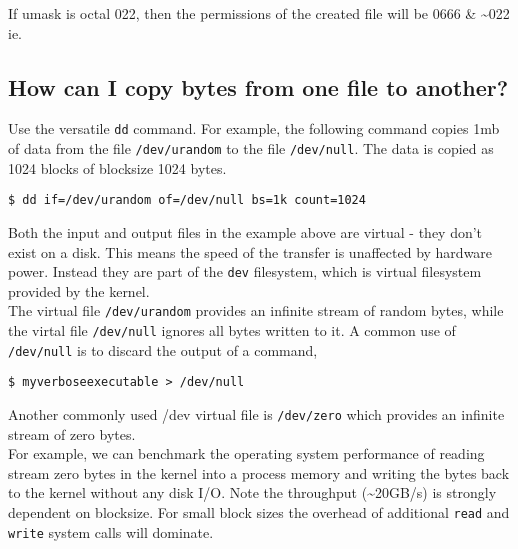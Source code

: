 If umask is octal 022, then the permissions of the created file will be
0666 \& \textasciitilde{}022\\ie.

\begin{Shaded}
\begin{Highlighting}[]
\end{Highlighting}
\end{Shaded}

\subsection{How can I copy bytes from one file to
another?}\label{how-can-i-copy-bytes-from-one-file-to-another}

Use the versatile \texttt{dd} command. For example, the following
command copies 1mb of data from the file \texttt{/dev/urandom} to the
file \texttt{/dev/null}. The data is copied as 1024 blocks of blocksize
1024 bytes.

\begin{verbatim}
$ dd if=/dev/urandom of=/dev/null bs=1k count=1024
\end{verbatim}

Both the input and output files in the example above are virtual - they
don't exist on a disk. This means the speed of the transfer is
unaffected by hardware power. Instead they are part of the \texttt{dev}
filesystem, which is virtual filesystem provided by the kernel.\\The
virtual file \texttt{/dev/urandom} provides an infinite stream of random
bytes, while the virtal file \texttt{/dev/null} ignores all bytes
written to it. A common use of \texttt{/dev/null} is to discard the
output of a command,

\begin{verbatim}
$ myverboseexecutable > /dev/null
\end{verbatim}

Another commonly used /dev virtual file is \texttt{/dev/zero} which
provides an infinite stream of zero bytes.\\For example, we can
benchmark the operating system performance of reading stream zero bytes
in the kernel into a process memory and writing the bytes back to the
kernel without any disk I/O. Note the throughput
(\textasciitilde{}20GB/s) is strongly dependent on blocksize. For small
block sizes the overhead of additional \texttt{read} and \texttt{write}
system calls will dominate.

